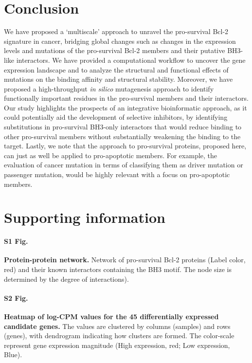 \documentclass[10pt,letterpaper]{article}
\begin{document}
\section*{Conclusion}
We have proposed a ‘multiscale’ approach to unravel the pro-survival Bcl-2 signature in cancer, bridging global changes such as changes in the expression levels and mutations of the pro-survival Bcl-2 members and their putative BH3-like interactors. We have provided a computational workflow to uncover the gene expression landscape and to analyze the structural and functional effects of mutations on the binding affinity and structural stability. Moreover, we have proposed a high-throughput \textit{in silico} mutagenesis approach to identify functionally important residues in the pro-survival members and their interactors. Our study highlights the prospects of an integrative bioinformatic approach, as it could potentially aid the development of selective inhibitors, by identifying substitutions in pro-survival BH3-only interactors that would reduce binding to other pro-survival members without substantially weakening the binding to the target.
Lastly, we note that the approach to pro-survival proteins, proposed here, can just as well be applied to pro-apoptotic members. For example, the evaluation of cancer mutation in terms of classifying them as driver mutation or passenger mutation, would be highly relevant with a focus on pro-apoptotic members. 


\section*{Supporting information}

\paragraph*{S1 Fig.}
\label{S1_Fig}
{\bf Protein-protein network.}
Network of pro-survival Bcl-2 proteins (Label color, red) and their known interactors containing the BH3 motif. The node size is determined by the degree of interactions).

\paragraph*{S2 Fig.}
\label{S2_Fig}
{\bf Heatmap of log-CPM values for the 45 differentially expressed candidate genes.}
The values are clustered by columns (samples) and rows (genes), with dendrogram indicating how clusters are formed. The color-scale represent gene expression magnitude (High expression, red; Low expression, Blue).
\end{document}
